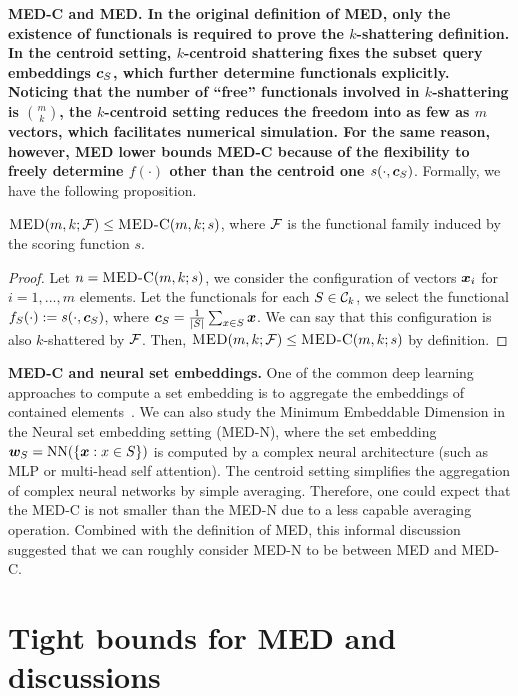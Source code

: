 \documentclass[10pt]{article}
\begin{document}
\textbf{MED-C and MED. In the original definition of MED, only the existence of functionals is required to prove the $k$-shattering definition. In the centroid setting, $k$-centroid shattering fixes the subset query embeddings $\bm{c}_S$, which further determine functionals explicitly. Noticing that the number of ``free'' functionals involved in $k$-shattering is $\binom{m}{k}$, the $k$-centroid setting reduces the freedom into as few as $m$ vectors, which facilitates numerical simulation. For the same reason, however, MED lower bounds MED-C because of the flexibility to freely determine $f(\cdot)$ other than the centroid one $s(\cdot, \bm{c}_S)$}. Formally, we have the following proposition.
\begin{proposition}
    $\textsc{MED}(m, k; \mathcal{F}) \leq \textsc{MED-C} (m, k; s)$, where $\mathcal{F}$ is the functional family induced by the scoring function $s$.
\end{proposition}
\begin{proof}
    Let $n = \textsc{MED-C}(m, k; s)$, we consider the configuration of vectors $\bm{x}_i$ for $i=1,...,m$ elements. Let the functionals for each $S\in \mathcal{C}_k$, we select the functional $f_S(\cdot) := s(\cdot, \bm{c}_S)$, where $\bm{c}_S =\frac{1}{|S|} \sum_{x \in S} \bm{x}$. We can say that this configuration is also $k$-shattered by $\mathcal{F}$. Then, $\textsc{MED}(m, k; \mathcal{F}) \leq \textsc{MED-C}(m,k;s)$ by definition.
\end{proof}

\textbf{MED-C and neural set embeddings.} One of the common deep learning approaches to compute a set embedding is to aggregate the embeddings of contained elements~\cite{zaheer2017deep}. We can also study the Minimum Embeddable Dimension in the Neural set embedding setting (MED-N), where the set embedding $\bm{w}_S = {\rm NN}(\{\bm{x}: x \in S\})$ is computed by a complex neural architecture (such as MLP or multi-head self attention). The centroid setting simplifies the aggregation of complex neural networks by simple averaging. Therefore, one could expect that the MED-C is not smaller than the MED-N due to a less capable averaging operation. Combined with the definition of MED, this informal discussion suggested that we can roughly consider MED-N to be between MED and MED-C.

\section{Tight bounds for MED and discussions}\label{sec:optimal-standard-theory}
\end{document}
